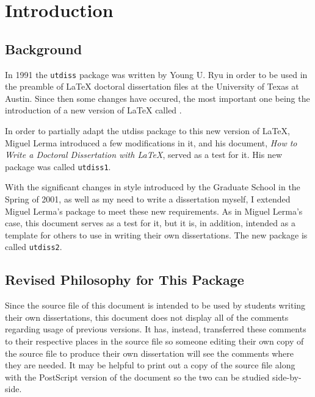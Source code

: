 \chapter{Introduction}
%

\section{Background}
%

In 1991 the \texttt{utdiss} package was written by Young U. Ryu 
%
in order to be used in the preamble of \LaTeX{} doctoral dissertation
files at the University of Texas at Austin. 
%
Since then some changes have occured, the most important one
being the introduction of a new version of \LaTeX{} 
%
called \LaTeXe{}. 
%

In order to partially adapt the utdiss package to this new version
of \LaTeX{}, Miguel Lerma introduced a few modifications in it,
and his document, \textit{How to Write a Doctoral Dissertation
with \LaTeX{}}, served as a test for it. His new package was
called \texttt{utdiss1}.
%

With the significant changes in style introduced by the Graduate
School in the Spring of 2001, as well as  my need to write a
dissertation myself, I extended Miguel Lerma's package to meet
these new requirements. As in Miguel Lerma's case, this document
serves as a test for it, but it is, in addition, intended as a
template for others to use in writing their own dissertations.
The new package is called \texttt{utdiss2}.
%

\section{Revised Philosophy for This Package}
%

Since the source file of this document is intended to be used by students
writing their own dissertations, this document does not display all of the
comments regarding usage of previous versions. It has, instead, transferred
these comments to their respective places in the source file so someone
editing their own copy of the source file to produce their own dissertation
will see the comments where they are needed. It may be helpful to print out
a copy of the source file along with the PostScript version of the document
so the two can be studied side-by-side.

